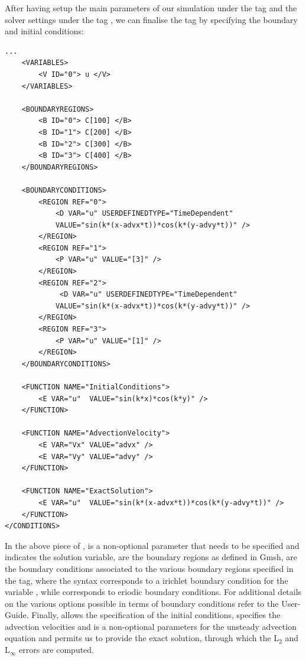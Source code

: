 After having setup the main parameters of our simulation under the tag  
and the solver settings under the tag , we can finalise the 
tag by specifying the boundary and initial conditions:
%
\begin{lstlisting}[style=XMLStyle]
    ...
    <VARIABLES>
        <V ID="0"> u </V>
    </VARIABLES>
        
    <BOUNDARYREGIONS>
        <B ID="0"> C[100] </B>
        <B ID="1"> C[200] </B>
        <B ID="2"> C[300] </B>
        <B ID="3"> C[400] </B>
    </BOUNDARYREGIONS>
        
    <BOUNDARYCONDITIONS>
        <REGION REF="0">
            <D VAR="u" USERDEFINEDTYPE="TimeDependent"
            VALUE="sin(k*(x-advx*t))*cos(k*(y-advy*t))" />
        </REGION>
        <REGION REF="1">
            <P VAR="u" VALUE="[3]" />
        </REGION>
        <REGION REF="2">
             <D VAR="u" USERDEFINEDTYPE="TimeDependent"
            VALUE="sin(k*(x-advx*t))*cos(k*(y-advy*t))" />
        </REGION>
        <REGION REF="3">
            <P VAR="u" VALUE="[1]" />
        </REGION>
    </BOUNDARYCONDITIONS>
        
    <FUNCTION NAME="InitialConditions">
        <E VAR="u"  VALUE="sin(k*x)*cos(k*y)" />
    </FUNCTION>
    
    <FUNCTION NAME="AdvectionVelocity">
        <E VAR="Vx" VALUE="advx" />
        <E VAR="Vy" VALUE="advy" />
    </FUNCTION>
        
    <FUNCTION NAME="ExactSolution">
        <E VAR="u"  VALUE="sin(k*(x-advx*t))*cos(k*(y-advy*t))" />
    </FUNCTION>
</CONDITIONS>
\end{lstlisting}
%
In the above piece of ,  is a non-optional parameter that needs to be specified 
and indicates the solution variable,  are the boundary regions as defined in 
Gmsh,  are the boundary conditions associated to the various boundary 
regions specified in the  tag, where the syntax  corresponds 
to a irichlet boundary condition for the variable , while  corresponds 
to eriodic boundary conditions. For additional details on the various options possible in terms 
of boundary conditions refer to the User-Guide.
Finally,  allows the specification of the initial conditions, 
 specifies the advection velocities and is a non-optional 
parameters for the unsteady advection equation and  
permits us to provide the exact solution, through which the L$_{2}$ and L$_{\infty}$ errors are computed.




